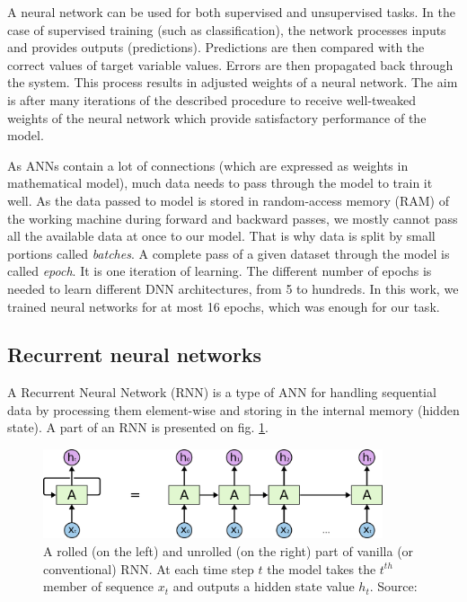 A neural network can be used for both supervised and unsupervised tasks. In the case of supervised training (such as classification), the network processes inputs and provides outputs (predictions). Predictions are then compared with the correct values of target variable values. Errors are then propagated back through the system. This process results in adjusted weights of a neural network. The aim is after many iterations of the described procedure to receive well-tweaked weights of the neural network which provide satisfactory performance of the model. 

As ANNs contain a lot of connections (which are expressed as weights in mathematical model), much data needs to pass through the model to train it well. As the data passed to model is stored in random-access memory (RAM) of the working machine during forward and backward passes, we mostly cannot pass all the available data at once to our model. That is why data is split by small portions called \textit{batches}. A complete pass of a given dataset through the model is called \textit{epoch}. It is one iteration of learning. The different number of epochs is needed to learn different DNN architectures, from 5 to hundreds. In this work, we trained neural networks for at most 16 epochs, which was enough for our task.

\subsection{Recurrent neural networks}
\label{sec:rnn}
A Recurrent Neural Network (RNN) is a type of ANN for handling sequential data by processing them element-wise and storing in the internal memory (hidden state). A part of an RNN is presented on fig. \ref{fig:rnn}.

\begin{figure}[h]
    \centering
    \includegraphics[width=10cm]{Images/RNN-unrolled.png}
    \caption{A rolled (on the left) and unrolled (on the right) part of vanilla (or conventional) RNN. At each time step $t$ the model takes the $t^{th}$ member of sequence $x_t$ and outputs a hidden state value $h_t$. Source: \citep{Olah-2015}}
    \label{fig:rnn}
\end{figure} 


